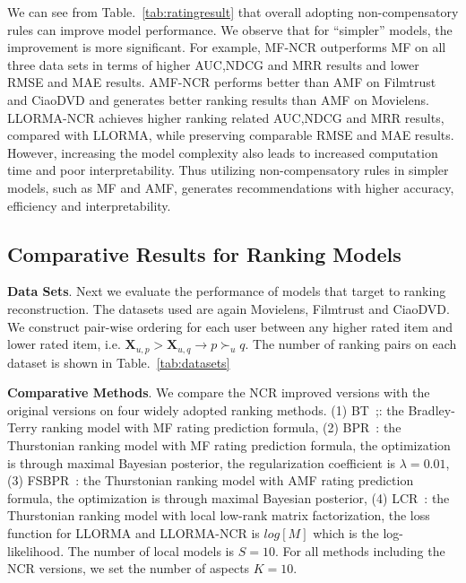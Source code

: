 \documentclass[letterpaper]{article} %
\newcommand{\Rating}{\mathbf{X}}
\begin{document}
We can see from Table.~\ref{tab:ratingresult} that overall adopting non-compensatory rules can improve model performance. We observe that for ``simpler'' models, the improvement is more significant. For example, MF-NCR outperforms MF on all three data sets in terms of higher AUC,NDCG and MRR results and lower RMSE and MAE results. AMF-NCR performs better than AMF on Filmtrust and CiaoDVD and generates better ranking results than AMF on Movielens. LLORMA-NCR achieves higher ranking related AUC,NDCG and MRR results, compared with LLORMA, while preserving comparable RMSE and MAE results.  However, increasing the model complexity also leads to increased computation time and poor interpretability. Thus utilizing non-compensatory rules in simpler models, such as MF and AMF, generates recommendations with higher accuracy, efficiency and interpretability. 


\subsection{Comparative Results for Ranking Models}

\textbf{Data Sets}. Next we evaluate the performance of models that target to ranking reconstruction. The datasets used are again Movielens, Filmtrust and CiaoDVD. We construct pair-wise ordering for each user between any higher rated item and lower rated item, i.e. $\Rating_{u,p}>\Rating_{u,q}\rightarrow p\succ_u q$. The number of ranking pairs on each dataset is shown in Table.~\ref{tab:datasets}

\textbf{Comparative Methods}. We compare the NCR improved versions with the original versions on four widely adopted ranking methods. (1) BT~\cite{Hu2016Improved};: the Bradley-Terry ranking model with MF rating prediction formula, (2) BPR~\cite{Rendle2009BPR}:  the Thurstonian ranking model with MF rating prediction formula, the optimization is through maximal Bayesian posterior, the regularization coefficient is $\lambda=0.01$, (3) FSBPR~\cite{Zhao2018Factored}: the Thurstonian ranking model with AMF rating prediction formula, the optimization is through maximal Bayesian posterior, (4) LCR~\cite{Lee2014Local}: the Thurstonian ranking model with local low-rank matrix factorization, the loss function for LLORMA and LLORMA-NCR is $log[M]$ which is the log-likelihood. The number of local models  is $S=10$.  For all methods including the NCR versions, we set the number of aspects $K=10$. 
\end{document}
